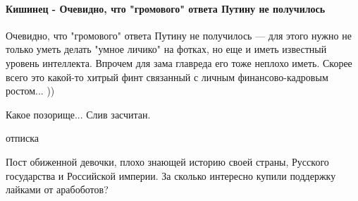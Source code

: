  
 
 
 
 
\paragraph{Кишинец - Очевидно, что "громового" ответа Путину не получилось}

\begin{itemize}
 
Очевидно, что "громового" ответа Путину не получилось — для этого нужно не
только уметь делать "умное личико" на фотках, но еще и иметь известный уровень
интеллекта. Впрочем для зама главреда его тоже неплохо иметь. Скорее всего это
какой-то хитрый финт связанный с личным финансово-кадровым ростом... ))


 
Какое позорище...
Слив засчитан.

 
отписка

 

Пост обиженной девочки, плохо знающей историю своей страны, Русского
государства и Российской империи. За сколько интересно купили поддержку лайками
от арабоботов?

 

\end{itemize}
